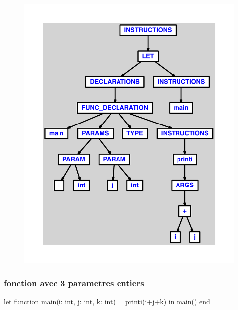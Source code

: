 \documentclass{article}
\begin{document}
\begin{figure}[H]\centering\includegraphics[max width=\textwidth]{ast/ast_225.pdf}\end{figure}\subsubsection{fonction avec 3 parametres entiers}
\begin{verbatimtab}
let
	function main(i: int, j: int, k: int) = printi(i+j+k)
in main() end
\end{verbatimtab}
\end{document}

